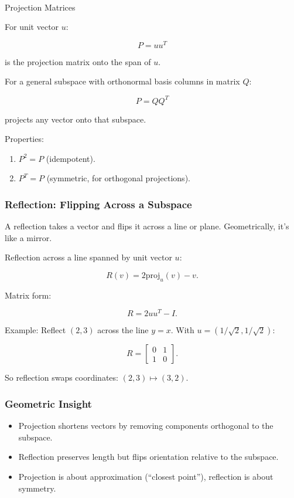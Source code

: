 \documentclass[
  letterpaper,
  DIV=11,
  numbers=noendperiod]{scrreprt}
\makeatletter
\let\oldparagraph\paragraph
\renewcommand{\paragraph}{
    \@ifstar
      \xxxParagraphStar
      \xxxParagraphNoStar
  }
\newcommand{\xxxParagraphStar}[1]{\oldparagraph*{#1}\mbox{}}
\newcommand{\xxxParagraphNoStar}[1]{\oldparagraph{#1}\mbox{}}
\providecommand{\tightlist}{%
  \setlength{\itemsep}{0pt}\setlength{\parskip}{0pt}}
\makeatother
\begin{document}
\paragraph{Projection Matrices}\label{projection-matrices}

For unit vector \(u\):

\[
P = uu^T
\]

is the projection matrix onto the span of \(u\).

For a general subspace with orthonormal basis columns in matrix \(Q\):

\[
P = QQ^T
\]

projects any vector onto that subspace.

Properties:

\begin{enumerate}
\def\labelenumi{\arabic{enumi}.}
\tightlist
\item
  \(P^2 = P\) (idempotent).
\item
  \(P^T = P\) (symmetric, for orthogonal projections).
\end{enumerate}

\subsubsection{Reflection: Flipping Across a
Subspace}\label{reflection-flipping-across-a-subspace}

A reflection takes a vector and flips it across a line or plane.
Geometrically, it's like a mirror.

Reflection across a line spanned by unit vector \(u\):

\[
R(v) = 2\text{proj}_u(v) - v.
\]

Matrix form:

\[
R = 2uu^T - I.
\]

Example: Reflect \((2,3)\) across the line \(y=x\). With
\(u=(1/\sqrt{2},1/\sqrt{2})\):

\[
R = \begin{bmatrix} 0 & 1 \\ 1 & 0 \end{bmatrix}.
\]

So reflection swaps coordinates: \((2,3) \mapsto (3,2)\).

\subsubsection{Geometric Insight}\label{geometric-insight-1}

\begin{itemize}
\tightlist
\item
  Projection shortens vectors by removing components orthogonal to the
  subspace.
\item
  Reflection preserves length but flips orientation relative to the
  subspace.
\item
  Projection is about approximation (``closest point''), reflection is
  about symmetry.
\end{itemize}
\end{document}
